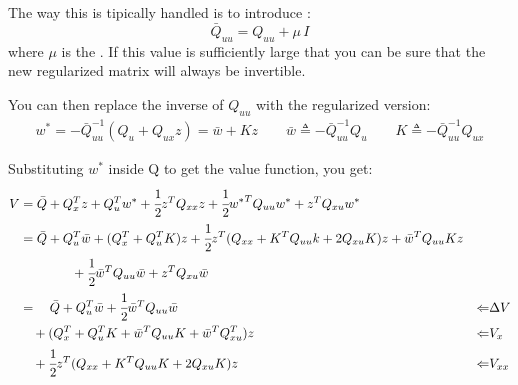 The way this is tipically handled is to introduce :
\[\bar{Q}_{uu} = Q_{uu} + \mu\,I\]
where $\mu$ is the . If this value is sufficiently large that you can be sure that the new regularized matrix will always be invertible.

You can then replace the inverse of $Q_{uu}$ with the regularized version:
\begin{gather*}
w^* = -\bar{Q}_{uu}^{-1}(Q_u + Q_{ux}z) = \bar{w} + Kz \qquad \bar{w} \triangleq - \bar{Q}_{uu}^{-1}Q_u \qquad K \triangleq - \bar{Q}_{uu}^{-1}Q_{ux}
\end{gather*}

Substituting $w^*$ inside Q to get the value function, you get:
\begin{align*}
V &= \bar{Q} + Q_x^T z + Q_u^Tw^* + \cfrac{1}{2}z^TQ_{xx}z + \cfrac{1}{2}{w^*}^TQ_{uu}w^* + z^TQ_{xu}w^*&&\\
&=\bar{Q} + Q_u^T\bar{w} + (Q_x^T + Q_u^TK)z + \cfrac{1}{2}z^T(Q_{xx} + K^TQ_{uu}k + 2Q_{xu}K)z + \bar{w}^TQ_{uu}Kz &&\\
&\qquad\qquad+ \cfrac{1}{2}\bar{w}^TQ_{uu}\bar{w} + z^TQ_{xu}\bar{w}&&\\
&= \quad \bar{Q} + Q_u^T \bar{w} + \cfrac{1}{2}\bar{w}^TQ_{uu}\bar{w}&\Leftarrow&\Delta V\\
& \quad+(Q_x^T +Q_u^TK + \bar{w}^TQ_{uu}K + \bar{w}^TQ_{xu}^T)z&\Leftarrow &V_x\\
&\quad+\cfrac{1}{2}z^T(Q_{xx} + K^TQ_{uu}K + 2Q_{xu}K)z&\Leftarrow &V_{xx}
\end{align*}

